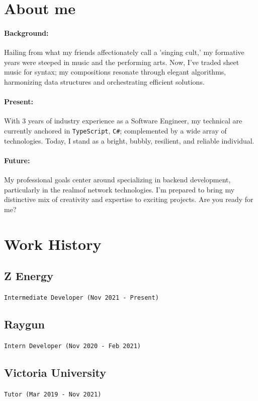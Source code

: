 \documentclass[a4paper, 10pt]{article}
\newcommand{\code}[1]{\mbox{\textcolor{code}{\texttt{#1}}}}
\begin{document}
\begin{multicols*}{2}
	\section*{About me}
	\paragraph*{Background:}
	Hailing from what my friends affectionately call a 'singing cult,' my formative years were steeped in music and the performing arts. Now, I've traded sheet music for syntax; my compositions resonate through elegant algorithms, harmonizing data structures and orchestrating efficient solutions.
	\paragraph*{Present:}
	With 3 years of industry experience as a Software Engineer, my technical are currently anchored in \code{TypeScript}, \code{C\#}; complemented by a wide array of technologies. Today, I stand as a bright, bubbly, resilient, and reliable individual.
	\paragraph*{Future:}
	My professional goals center around specializing in backend development, particularly in the realmof network technologies. I'm prepared to bring my distinctive mix of creativity and expertise to exciting projects. Are you ready for me?

	\section*{Work History}
	\subsection*{Z Energy}
	{\small{\texttt{Intermediate Developer (Nov 2021 - Present)}}}
	\subsection*{Raygun}
	{\small{\texttt{Intern Developer (Nov 2020 - Feb 2021)}}}
	\subsection*{Victoria University}
	{\small{\texttt{Tutor (Mar 2019 - Nov 2021)}}}


\end{multicols*}
\end{document}
